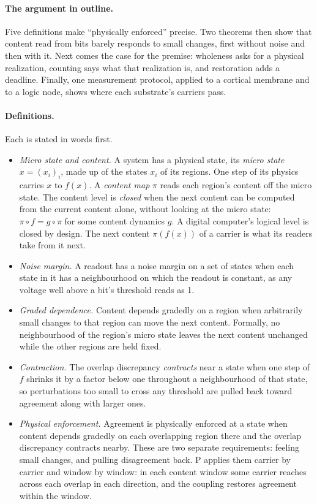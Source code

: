 \documentclass[12pt]{article}
\begin{document}
\paragraph{The argument in outline.} Five definitions make ``physically
enforced'' precise. Two theorems then show that content read from bits barely
responds to small changes, first without noise and then with it. Next comes the
case for the premise: wholeness asks for a physical realization, counting says
what that realization is, and restoration adds a deadline. Finally, one
measurement protocol, applied to a cortical membrane and to a logic node, shows
where each substrate's carriers pass.

\paragraph{Definitions.} Each is stated in words first.
\begin{itemize}
\item \emph{Micro state and content.} A system has a physical state, its
\emph{micro state} $x=(x_i)_i$, made up of the states $x_i$ of its regions. One
step of its physics carries $x$ to $f(x)$. A \emph{content map} $\pi$ reads each
region's content off the micro state. The content level is \emph{closed} when
the next content can be computed from the current content alone, without
looking at the micro state: $\pi\circ f = g\circ\pi$ for some content dynamics
$g$. A digital computer's logical level is closed by design. The next content
$\pi(f(x))$ of a carrier is what its readers take from it next.
\item \emph{Noise margin.} A readout has a noise margin on a set of states when
each state in it has a neighbourhood on which the readout is constant, as any
voltage well above a bit's threshold reads as 1.
\item \emph{Graded dependence.} Content depends gradedly on a region when
arbitrarily small changes to that region can move the next content. Formally, no
neighbourhood of the region's micro state leaves the next content unchanged
while the other regions are held fixed.
\item \emph{Contraction.} The overlap discrepancy \emph{contracts} near a state
when one step of $f$ shrinks it by a factor below one throughout a
neighbourhood of that state, so perturbations too small to cross any threshold
are pulled back toward agreement along with larger ones.
\item \emph{Physical enforcement.} Agreement is physically enforced at a state
when content depends gradedly on each overlapping region there and the
overlap discrepancy contracts nearby. These are two separate requirements:
feeling small changes, and pulling disagreement back. P applies them carrier
by carrier and window by window: in each content window some carrier reaches
across each overlap in each direction, and the coupling restores agreement
within the window.
\end{itemize}
\end{document}
